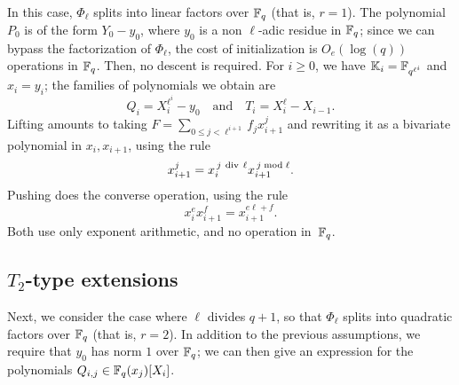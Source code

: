 \documentclass{sig-alternate}
\begin{document}
In this case, $\Phi_\ell$ splits into linear factors over $\mathbb{F}_q$ (that
is, $r=1$). The polynomial $P_0$ is of the form $Y_0-y_0$, where $y_0$
is a non $\ell$-adic residue in $\mathbb{F}_q$; since we can bypass the
factorization of $\Phi_\ell$, the cost of initialization is
$O_e(\log(q))$ operations in $\mathbb{F}_q$. Then, no descent is required. For
$i \ge 0$, we have $\mathbb{K}_i=\mathbb{F}_{q^{\ell^i}}$ and $x_i=y_i$; the families
of polynomials we obtain are
\begin{equation}
  \label{eq:T1}
  Q_i=X_i^{\ell^i}-y_0 \quad\text{and}\quad T_i=X_{i}^\ell-X_{i-1}.
\end{equation}
Lifting amounts to taking $F = \sum_{0 \le j < \ell^{i+1}} f_j
x_{i+1}^j$ and rewriting it as a bivariate polynomial in
$x_i,x_{i+1}$, using the rule
$$x_{i+1}^j = x_i^{\,j {\rm~div~} \ell} x_{i+1}^{\,j \bmod \ell}.$$
Pushing does the converse operation, using the rule
$$x_i^e x_{i+1}^f = x_{i+1}^{e \ell + f}.$$ Both 
use only exponent arithmetic, and no operation in~$\mathbb{F}_q$. 


\subsection{$T_2$-type extensions}
\label{ssec:T2}

Next, we consider the case where $\ell$ divides $q+1$, so that
$\Phi_\ell$ splits into quadratic factors over $\mathbb{F}_q$ (that is,
$r=2$). In addition to the previous assumptions, we require that $y_0$
has norm $1$ over $\mathbb{F}_q$; we can then give an expression for the
polynomials $Q_{i,j} \in \mathbb{F}_q(x_{j})[X_i]$.
\end{document}
